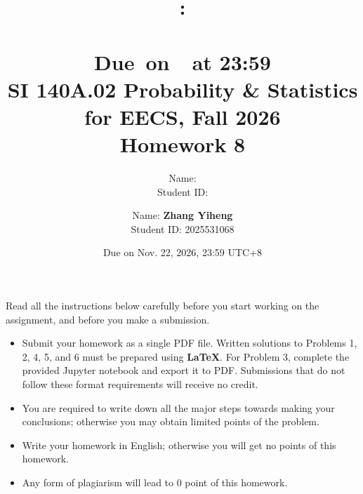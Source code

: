 \documentclass[a4paper]{article}
\title{
    \vspace{2in}
    \textmd{\textbf{\hmwkClass:\\  \hmwkTitle}}\\
    \normalsize\vspace{0.1in}\small{Due\ on\ \hmwkDueDate\ at 23:59}\\
	\vspace{4in}
}
\author{
	Name: \textbf{\hmwkAuthorName} \\
	Student ID: \hmwkAuthorID}
\date{}
\newcommand{\hmwkAuthorName}{Zhang Yiheng}
\newcommand{\hmwkAuthorID}{2025531068}
\begin{document}

\date{
Due on Nov. 22, 2026, 23:59 UTC+8}
\title{SI 140A.02  Probability \& Statistics for EECS, Fall 2026 \\
Homework 8}
\author{Name: \textbf{\hmwkAuthorName} \\ Student ID: \hmwkAuthorID}
\maketitle
Read all the instructions below carefully before you start working on the assignment, and before you make a submission.
\begin{itemize}
    \item Submit your homework as a single PDF file.
Written solutions to Problems 1, 2, 4, 5, and 6 must be
prepared using \textbf{LaTeX}. For Problem 3, complete the
provided Jupyter notebook and export it to PDF.
Submissions that do not follow these format requirements
will receive no credit.
    \item You are required to write down all the major steps towards making your conclusions; otherwise you may obtain limited points of the problem.
    \item Write your homework in English; otherwise you will get no points of this homework.
    \item Any form of plagiarism will lead to $0$ point of this homework. 
\end{itemize}
\newpage
\end{document}
